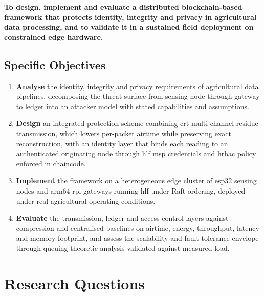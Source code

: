 \documentclass[12pt,a4paper,oneside]{book}
\begin{document}
\textbf{To design, implement and evaluate a distributed blockchain-based
framework that protects identity, integrity and privacy in agricultural data
processing, and to validate it in a sustained field deployment on constrained
edge hardware.}

\subsection{Specific Objectives}
\label{subsec:specific_objectives}

\begin{enumerate}
  \item \textbf{Analyse} the identity, integrity and privacy requirements of
        agricultural data pipelines, decomposing the threat surface from
        sensing node through gateway to ledger into an attacker model with
        stated capabilities and assumptions.

  \item \textbf{Design} an integrated protection scheme combining \gls{crt}
        multi-channel residue transmission, which lowers per-packet airtime
        while preserving exact reconstruction, with an identity layer that
        binds each reading to an authenticated originating node through
        \gls{hlf} \gls{msp} credentials and \gls{hrbac} policy enforced in
        chaincode.

  \item \textbf{Implement} the framework on a heterogeneous edge cluster of
        \gls{esp32} sensing nodes and \gls{arm64} \gls{rpi} gateways running
        \gls{hlf} under Raft ordering, deployed under real agricultural
        operating conditions.

  \item \textbf{Evaluate} the transmission, ledger and access-control layers
        against compression and centralised baselines on airtime, energy,
        throughput, latency and memory footprint, and assess the scalability
        and fault-tolerance envelope through queuing-theoretic analysis
        validated against measured load.
\end{enumerate}

\section{Research Questions}
\label{sec:research_questions}
\end{document}
